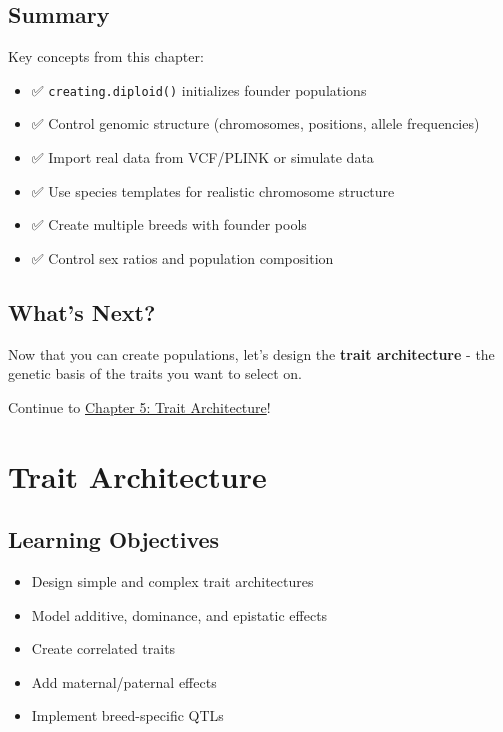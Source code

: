 \documentclass[
  letterpaper,
]{book}
\providecommand{\tightlist}{%
  \setlength{\itemsep}{0pt}\setlength{\parskip}{0pt}}
\begin{document}
\section{Summary}\label{summary-3}

Key concepts from this chapter:

\begin{itemize}
\tightlist
\item
  ✅ \texttt{creating.diploid()} initializes founder populations
\item
  ✅ Control genomic structure (chromosomes, positions, allele
  frequencies)
\item
  ✅ Import real data from VCF/PLINK or simulate data
\item
  ✅ Use species templates for realistic chromosome structure
\item
  ✅ Create multiple breeds with founder pools
\item
  ✅ Control sex ratios and population composition
\end{itemize}

\section{What's Next?}\label{whats-next-3}

Now that you can create populations, let's design the \textbf{trait
architecture} - the genetic basis of the traits you want to select on.

Continue to \href{05-trait-architecture.qmd}{Chapter 5: Trait
Architecture}!

\chapter{Trait Architecture}\label{sec-trait-architecture}

\section{Learning Objectives}\label{learning-objectives-4}

\begin{itemize}
\tightlist
\item
  Design simple and complex trait architectures
\item
  Model additive, dominance, and epistatic effects
\item
  Create correlated traits
\item
  Add maternal/paternal effects
\item
  Implement breed-specific QTLs
\end{itemize}
\end{document}

